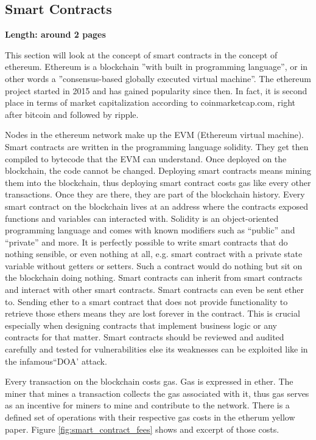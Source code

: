 \subsection{Smart Contracts}
\label{subsec:02_smart_contracts}

\textbf{Length: around 2 pages}

This section will look at the concept of smart contracts in the concept of ethereum.
Ethereum is a blockchain ''with built in programming language'', or in other words a ''consensus-based globally executed virtual machine''. 
The ethereum project started in 2015 and has gained popularity since then. In fact, it is second place in terms of market capitalization according to coinmarketcap.com, right after bitcoin and followed by ripple.

Nodes in the ethereum network make up the EVM (Ethereum virtual machine). Smart contracts are written in the programming language solidity. They get then compiled to bytecode that the EVM can understand.
Once deployed on the blockchain, the code cannot be changed. Deploying smart contracts means mining them into the blockchain, thus deploying smart contract costs gas like every other transactions. Once they are there, they are part of the blockchain history.
Every smart contract on the blockchain lives at an address where the contracts exposed functions and variables can interacted with. Solidity is an object-oriented programming language and comes with known modifiers such as ``public'' and ``private'' and more.
It is perfectly possible to write smart contracts that do nothing sensible, or even nothing at all, e.g. smart contract with a private state variable without getters or setters.
Such a contract would do nothing but sit on the blockchain doing nothing. Smart contracts can inherit from smart contracts and interact with other smart contracts. 
Smart contracts can even be sent ether to. Sending ether to a smart contract that does not provide functionality to retrieve those ethers means they are lost forever in the contract.
This is crucial especially when designing contracts that implement business logic or any contracts for that matter. Smart contracts should be reviewed and audited carefully and tested for vulnerabilities else its weaknesses can be exploited like in the infamous``DOA' attack.

Every transaction on the blockchain costs gas. Gas is expressed in ether. The miner that mines a transaction collects the gas associated with it, thus gas serves as an incentive for miners to mine and contribute to the network. There is a defined set of operations with their respective gas costs in the etherum yellow paper.
Figure \ref{fig:smart_contract_fees} shows and excerpt of those costs.

